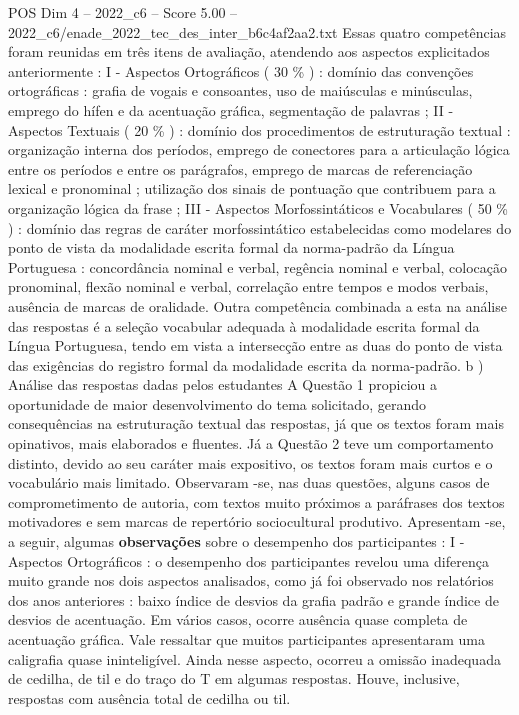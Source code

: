 \begin{textsample}{POS Dim 4 – 2022\_c6 – Score 5.00 – 2022\_c6/enade\_2022\_tec\_des\_inter\_b6c4af2aa2.txt}
Essas quatro competências foram reunidas em três itens de avaliação, atendendo aos aspectos explicitados anteriormente : I - Aspectos Ortográficos ( 30 \% ) : domínio das convenções ortográficas : grafia de vogais e consoantes, uso de maiúsculas e minúsculas, emprego do hífen e da acentuação gráfica, segmentação de palavras ; II - Aspectos Textuais ( 20 \% ) : domínio dos procedimentos de estruturação textual : organização interna dos períodos, emprego de conectores para a articulação lógica entre os períodos e entre os parágrafos, emprego de marcas de referenciação lexical e pronominal ; utilização dos sinais de pontuação que contribuem para a organização lógica da frase ; III - Aspectos Morfossintáticos e Vocabulares ( 50 \% ) : domínio das regras de caráter morfossintático estabelecidas como modelares do ponto de vista da modalidade escrita formal da norma-padrão da Língua Portuguesa : concordância nominal e verbal, regência nominal e verbal, colocação pronominal, flexão nominal e verbal, correlação entre tempos e modos verbais, ausência de marcas de oralidade.
Outra competência combinada a esta na análise das respostas é a seleção vocabular adequada à modalidade escrita formal da Língua Portuguesa, tendo em vista a intersecção entre as duas do ponto de vista das exigências do registro formal da modalidade escrita da norma-padrão. b ) Análise das respostas dadas pelos estudantes A Questão 1 propiciou a oportunidade de maior desenvolvimento do tema solicitado, gerando consequências na estruturação textual das respostas, já que os textos foram mais opinativos, mais elaborados e fluentes.
Já a Questão 2 teve um comportamento distinto, devido ao seu caráter mais expositivo, os textos foram mais curtos e o vocabulário mais limitado.
Observaram -se, nas duas questões, alguns casos de comprometimento de autoria, com textos muito próximos a paráfrases dos textos motivadores e sem marcas de repertório sociocultural produtivo.
Apresentam -se, a seguir, algumas \textbf{observações} sobre o desempenho dos participantes : I - Aspectos Ortográficos : o desempenho dos participantes revelou uma diferença muito grande nos dois aspectos analisados, como já foi observado nos relatórios dos anos anteriores : baixo índice de desvios da grafia padrão e grande índice de desvios de acentuação.
Em vários casos, ocorre ausência quase completa de acentuação gráfica.
Vale ressaltar que muitos participantes apresentaram uma caligrafia quase ininteligível.
Ainda nesse aspecto, ocorreu a omissão inadequada de cedilha, de til e do traço do T em algumas respostas.
Houve, inclusive, respostas com ausência total de cedilha ou til.

\end{textsample}
